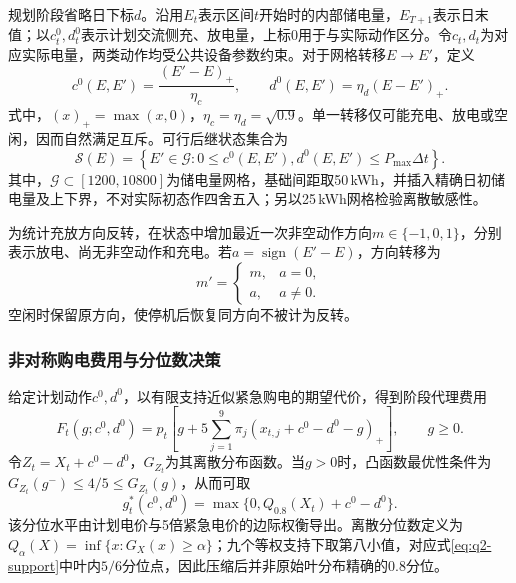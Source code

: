 规划阶段省略日下标$d$。沿用$E_t$表示区间$t$开始时的内部储电量，$E_{T+1}$表示日末值；以$c_t^0,d_t^0$表示计划交流侧充、放电量，上标0用于与实际动作区分。令$c_t,d_t$为对应实际电量，两类动作均受公共设备参数约束。对于网格转移$E\to E'$，定义
\begin{equation}\label{eq:q2-grid-action}
 c^0(E,E')=\frac{(E'-E)_+}{\eta_c},\qquad
 d^0(E,E')=\eta_d(E-E')_+.
\end{equation}
式中，$(x)_+=\max(x,0)$，$\eta_c=\eta_d=\sqrt{0.9}$。单一转移仅可能充电、放电或空闲，因而自然满足互斥。可行后继状态集合为
\begin{equation}\label{eq:q2-feasible-transition}
 \mathcal S(E)=\left\{E'\in\mathcal G:
 0\le c^0(E,E'),d^0(E,E')\le P_{\max}\Delta t\right\}.
\end{equation}
其中，$\mathcal G\subset[1200,10800]$为储电量网格，基础间距取50\,kWh，并插入精确日初储电量及上下界，不对实际初态作四舍五入；另以25\,kWh网格检验离散敏感性。

为统计充放方向反转，在状态中增加最近一次非空动作方向$m\in\{-1,0,1\}$，分别表示放电、尚无非空动作和充电。若$a=\operatorname{sign}(E'-E)$，方向转移为
\begin{equation}\label{eq:q2-mode}
 m'=\begin{cases}m,&a=0,\\a,&a\ne0.\end{cases}
\end{equation}
空闲时保留原方向，使停机后恢复同方向不被计为反转。

\subsubsection{非对称购电费用与分位数决策}

给定计划动作$c^0,d^0$，以有限支持近似紧急购电的期望代价，得到阶段代理费用
\begin{equation}\label{eq:q2-stage-cost}
 F_t(g;c^0,d^0)=p_t\left[g+5\sum_{j=1}^{9}\pi_j
 (x_{t,j}+c^0-d^0-g)_+\right],\qquad g\ge0.
\end{equation}
令$Z_t=X_t+c^0-d^0$，$G_{Z_t}$为其离散分布函数。当$g>0$时，凸函数最优性条件为$G_{Z_t}(g^-)\le4/5\le G_{Z_t}(g)$，从而可取
\begin{equation}\label{eq:q2-quantile-purchase}
 g_t^*(c^0,d^0)=\max\{0,Q_{0.8}(X_t)+c^0-d^0\}.
\end{equation}
该分位水平由计划电价与5倍紧急电价的边际权衡导出。离散分位数定义为$Q_\alpha(X)=\inf\{x:G_X(x)\ge\alpha\}$；九个等权支持下取第八小值，对应式\eqref{eq:q2-support}中叶内$5/6$分位点，因此压缩后并非原始叶分布精确的0.8分位。

